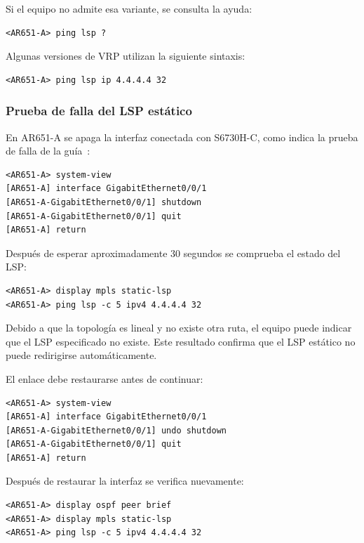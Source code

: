 Si el equipo no admite esa variante, se consulta la ayuda:

\begin{lstlisting}[style=terminal]
<AR651-A> ping lsp ?
\end{lstlisting}

Algunas versiones de VRP utilizan la siguiente sintaxis:

\begin{lstlisting}[style=terminal]
<AR651-A> ping lsp ip 4.4.4.4 32
\end{lstlisting}

\subsubsection{Prueba de falla del LSP estático}

En AR651-A se apaga la interfaz conectada con S6730H-C, como indica la prueba de falla de la guía~\cite[tarea~2.5]{guia-mpls-ar651-s6730h}:

\begin{lstlisting}[style=terminal]
<AR651-A> system-view
[AR651-A] interface GigabitEthernet0/0/1
[AR651-A-GigabitEthernet0/0/1] shutdown
[AR651-A-GigabitEthernet0/0/1] quit
[AR651-A] return
\end{lstlisting}

Después de esperar aproximadamente 30 segundos se comprueba el estado del
LSP:

\begin{lstlisting}[style=terminal]
<AR651-A> display mpls static-lsp
<AR651-A> ping lsp -c 5 ipv4 4.4.4.4 32
\end{lstlisting}

Debido a que la topología es lineal y no existe otra ruta, el equipo puede
indicar que el LSP especificado no existe. Este resultado confirma que el LSP
estático no puede redirigirse automáticamente.

El enlace debe restaurarse antes de continuar:

\begin{lstlisting}[style=terminal]
<AR651-A> system-view
[AR651-A] interface GigabitEthernet0/0/1
[AR651-A-GigabitEthernet0/0/1] undo shutdown
[AR651-A-GigabitEthernet0/0/1] quit
[AR651-A] return
\end{lstlisting}

Después de restaurar la interfaz se verifica nuevamente:

\begin{lstlisting}[style=terminal]
<AR651-A> display ospf peer brief
<AR651-A> display mpls static-lsp
<AR651-A> ping lsp -c 5 ipv4 4.4.4.4 32
\end{lstlisting}

